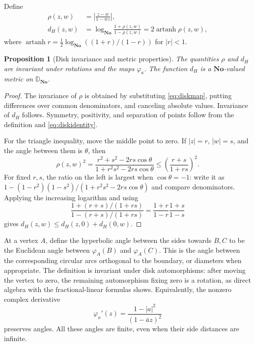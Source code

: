 \documentclass[11pt]{article}
\numberwithin{equation}{section}
\newtheorem{proposition}[theorem]{Proposition}
\theoremstyle{definition}
\newcommand{\No}{\mathbf{No}}
\newcommand{\artanh}{\operatorname{artanh}}
\begin{document}
Define
\begin{align}
 \rho(z,w)&=\left|\frac{z-w}{1-\bar w z}\right|,\\
 d_H(z,w)&=\log_{\No}\frac{1+\rho(z,w)}{1-\rho(z,w)}
 =2\artanh\rho(z,w),
 \label{eq:diskdistance}
\end{align}
where $\artanh r=\tfrac12\log_{\No}((1+r)/(1-r))$ for $|r|<1$.

\begin{proposition}[Disk invariance and metric properties]\label{prop:diskmetric}
The quantities $\rho$ and $d_H$ are invariant under rotations and the maps $\varphi_a$. The function $d_H$ is a $\No$-valued metric on $\mathbb D_{\No}$.
\end{proposition}
\begin{proof}
The invariance of $\rho$ is obtained by substituting \eqref{eq:diskmap}, putting differences over common denominators, and canceling absolute values. Invariance of $d_H$ follows. Symmetry, positivity, and separation of points follow from the definition and \eqref{eq:diskidentity}.

For the triangle inequality, move the middle point to zero. If $|z|=r$, $|w|=s$, and the angle between them is $\theta$, then
\[
 \rho(z,w)^2=\frac{r^2+s^2-2rs\cos\theta}
                   {1+r^2s^2-2rs\cos\theta}
 \le\left(\frac{r+s}{1+rs}\right)^2.
\]
For fixed $r,s$, the ratio on the left is largest when $\cos\theta=-1$: write it as $1-(1-r^2)(1-s^2)/(1+r^2s^2-2rs\cos\theta)$ and compare denominators. Applying the increasing logarithm and using
\[
 \frac{1+(r+s)/(1+rs)}{1-(r+s)/(1+rs)}
 =\frac{1+r}{1-r}\frac{1+s}{1-s}
\]
gives $d_H(z,w)\le d_H(z,0)+d_H(0,w)$.
\end{proof}

At a vertex $A$, define the hyperbolic angle between the sides towards $B,C$ to be the Euclidean angle between $\varphi_A(B)$ and $\varphi_A(C)$. This is the angle between the corresponding circular arcs orthogonal to the boundary, or diameters when appropriate. The definition is invariant under disk automorphisms: after moving the vertex to zero, the remaining automorphism fixing zero is a rotation, as direct algebra with the fractional-linear formulas shows. Equivalently, the nonzero complex derivative
\[
 \varphi_a'(z)=\frac{1-|a|^2}{(1-\bar a z)^2}
\]
preserves angles. All these angles are finite, even when their side distances are infinite.
\end{document}
